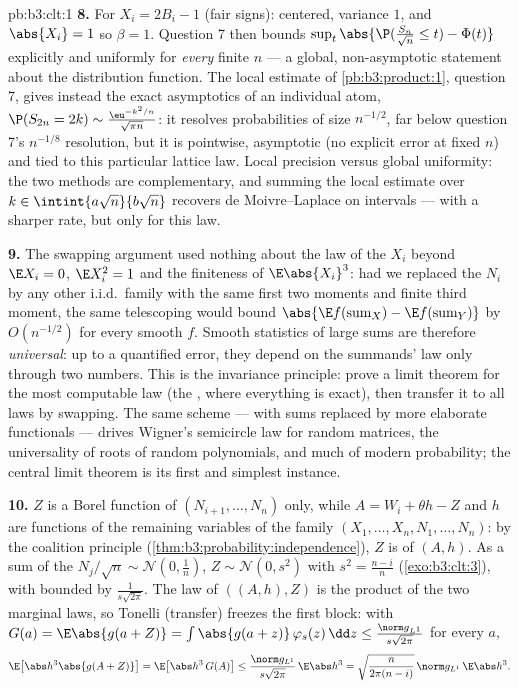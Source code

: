 \begin{solution}{pb:b3:clt:1}
\textbf{8.} For $X_i = 2B_i - 1$ (fair signs): centered,
variance $1$, and $\abs{X_i} = 1$ so $\beta = 1$. Question 7
then bounds $\sup_t\abs{\P(\frac{S_n}{\sqrt n} \leq t) -
\Phi(t)}$ explicitly and uniformly for \emph{every} finite
$n$ --- a global, non-asymptotic statement about the
distribution function. The local estimate of
\cref{pb:b3:product:1}, question 7, gives instead the exact
asymptotics of an individual atom, $\P(S_{2n} = 2k) \sim
\frac{\eu^{-k^2/n}}{\sqrt{\pi n}}$: it resolves
probabilities of size $n^{-1/2}$, far below question 7's
$n^{-1/8}$ resolution, but it is pointwise, asymptotic
(no explicit error at fixed $n$) and tied to this
particular lattice law. Local precision versus global
uniformity: the two methods are complementary, and summing
the local estimate over $k \in \intint{a\sqrt n}{b\sqrt n}$
recovers de Moivre--Laplace on intervals --- with a sharper
rate, but only for this law.

\textbf{9.} The swapping argument used nothing about the law
of the $X_i$ beyond $\E X_i = 0$, $\E X_i^2 = 1$ and the
finiteness of $\E\abs{X_i}^3$: had we replaced the 
$N_i$ by any other i.i.d.\ family with the same first two
moments and finite third moment, the same telescoping would
bound $\abs{\E f(\text{sum}_X) - \E f(\text{sum}_Y)}$ by
$O(n^{-1/2})$ for every smooth $f$. Smooth statistics of
large  sums are therefore \emph{universal}: up to
a quantified error, they depend on the summands' law only
through two numbers. This is the invariance principle:
prove a limit theorem for the most computable law (the
, where everything is exact), then transfer it to
all laws by swapping. The same scheme --- with sums replaced
by more elaborate functionals --- drives Wigner's semicircle
law for random matrices, the universality of roots of random
polynomials, and much of modern probability; the central
limit theorem is its first and simplest instance.

\textbf{10.} $Z$ is a Borel function of $(N_{i+1}, \dots,
N_n)$ only, while $A = W_i + \theta h - Z$ and $h$ are
functions of the remaining variables of the 
family $(X_1, \dots, X_n, N_1, \dots, N_n)$: by the
coalition principle (\cref{thm:b3:probability:independence}),
$Z$ is  of $(A, h)$. As a sum of the 
$N_j/\sqrt n \sim \mathcal N(0, \frac1n)$, $Z \sim \mathcal
N(0, s^2)$ with $s^2 = \frac{n-i}n$ (\cref{exo:b3:clt:3}),
with  bounded by $\frac1{s\sqrt{2\pi}}$. The law of
$((A, h), Z)$ is the product of the two marginal laws, so
Tonelli (transfer) freezes the first block: with $G(a) =
\E\abs{g(a + Z)} = \int\abs{g(a + z)}\,\varphi_s(z)\,\dd z
\leq \frac{\norm g_{L^1}}{s\sqrt{2\pi}}$ for every $a$,
\[
\E\bigl[\abs h^3\abs{g(A + Z)}\bigr] =
\E\bigl[\abs h^3\,G(A)\bigr] \leq
\frac{\norm g_{L^1}}{s\sqrt{2\pi}}\,\E\abs h^3
= \sqrt{\frac{n}{2\pi(n-i)}}\,\norm g_{L^1}\,\E\abs h^3 .
\]


\end{solution}

